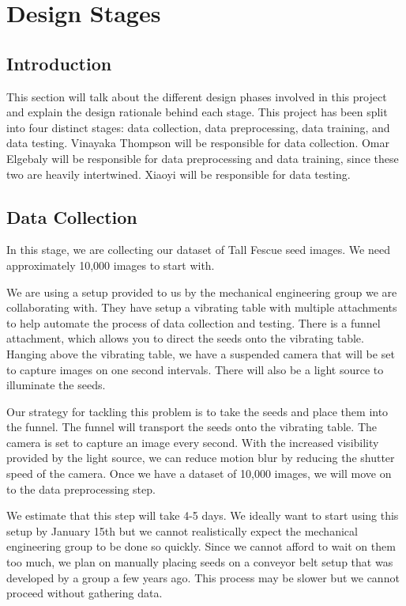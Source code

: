 \documentclass[onecolumn, draftclsnofoot,10pt, compsoc]{IEEEtran}
\begin{document}
\section{Design Stages}
\subsection{Introduction}

This section will talk about the different design phases involved in this project and explain the design rationale behind each stage. This project has been split into four distinct stages: data collection, data preprocessing, data training, and data testing. Vinayaka Thompson will be responsible for data collection. Omar Elgebaly will be responsible for data preprocessing and data training, since these two are heavily intertwined. Xiaoyi will be responsible for data testing. 

\subsection{Data Collection}
In this stage, we are collecting our dataset of Tall Fescue seed images. We need approximately 10,000 images to start with. 

We are using a setup provided to us by the mechanical engineering group we are collaborating with. They have setup a vibrating table with multiple attachments to help automate the process of data collection and testing. There is a funnel attachment, which allows you to direct the seeds onto the vibrating table. Hanging above the vibrating table, we have a suspended camera that will be set to capture images on one second intervals. There will also be a light source to illuminate the seeds.

Our strategy for tackling this problem is to take the seeds and place them into the funnel. The funnel will transport the seeds onto the vibrating table. The camera is set to capture an image every second. With the increased visibility provided by the light source, we can reduce motion blur by reducing the shutter speed of the camera. Once we have a dataset of 10,000 images, we will move on to the data preprocessing step. 

We estimate that this step will take 4-5 days. We ideally want to start using this setup by January 15th but we cannot realistically expect the mechanical engineering group to be done so quickly. Since we cannot afford to wait on them too much, we plan on manually placing seeds on a conveyor belt setup that was developed by a group a few years ago. This process may be slower but we cannot proceed without gathering data. 
\end{document}
